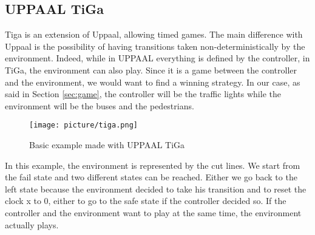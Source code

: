 \subsection{UPPAAL TiGa}
 Tiga is an extension of Uppaal, allowing timed games. The main difference with Uppaal is the possibility of having transitions taken non-deterministically by the environment. Indeed, while in UPPAAL everything is defined by the controller, in TiGa, the environment can also play. Since it is a game between the controller and the environment, we would want to find a winning strategy. In our case, as said in Section \ref{sec:game}, the controller will be the traffic lights while the environment will be the buses and the pedestrians.
 \begin{figure}[H]\label{fig:tiga}
  \begin{center}
    \texttt{[image: picture/tiga.png]}
    \caption{Basic example made with UPPAAL TiGa}
  \end{center}
\end{figure}
In this example, the environment is represented by the cut lines. We start from the fail state and two different states can be reached. Either we go back to the left state because the environment decided to take his transition and to reset the clock x to 0, either to go to the safe state if the controller decided so. If the controller and the environment want to play at the same time, the environment actually plays.
